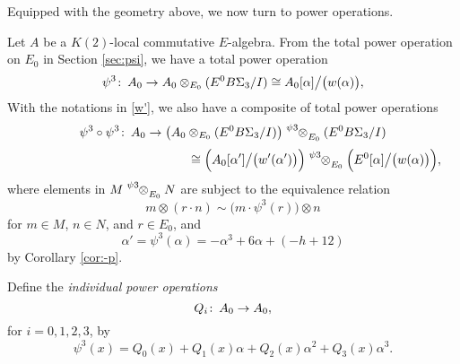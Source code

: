\documentclass{gtpart}
\theoremstyle{definition}
\theoremstyle{remark}
\def\co{\colon\thinspace}
\newcommand{\A}{\alpha}
\newcommand{\p}{\psi^3}
\begin{document}
Equipped with the geometry above, we now turn to power operations.  

Let $A$ be a $K(2)$-local commutative $E$-algebra.  
From the total power operation on $E_0$ in Section \ref{sec:psi}, we have a total power operation 
\[
 \p \co A_0 \to A_0 \otimes_{E_0} (E^0 B\Sigma_3 / I) \cong A_0 [\A] \big/ \big( w(\A) \big), 
\]
With the notations in \eqref{w'}, we also have a composite of total power operations 
\[
 \p \circ \p \co A_0 \to \big( A_0 \otimes_{E_0} (E^0 B\Sigma_3 / I) \big) \tensor[^\p]{\otimes}{_{E_0}} (E^0 B\Sigma_3 / I) 
\]
\[
 ~~~~~~~~~~~~~~~~~~~~~~~~~~~~~~~~~~~~~~~~\cong \Big( A_0 [\A'] \big/ \big( w'(\A') \big) \Big) \tensor[^\p]{\otimes}{_{E_0}} \Big( E^0 [\A] \big/ \big( w(\A) \big) \Big), 
\]
where elements in $M \tensor[^\p]{\otimes}{_{E_0}} N$ are subject to the equivalence relation 
\[
 m \otimes (r \cdot n) \sim \big( m \cdot \p(r) \big) \otimes n
\]
for $m \in M$, $n \in N$, and $r \in E_0$, and 
\[
 \A' = \p(\A) = -\A^3 + 6 \A + (-h + 12)
\]
by Corollary \ref{cor:-p}.  

Define the {\em individual power operations} 
\[
 Q_i \co A_0 \to A_0, 
\]
for $i = 0, 1, 2, 3$, by 
\[
 \p (x) = Q_0(x) + Q_1(x) \A + Q_2(x) \A^2 + Q_3(x) \A^3.  
\]
\end{document}
